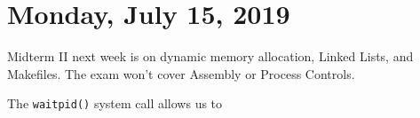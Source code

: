 \section{Monday, July 15, 2019}
Midterm II next week is on dynamic memory allocation, Linked Lists, and Makefiles. The exam won't cover Assembly or Process Controls.



The \verb!waitpid()! system call allows us to 